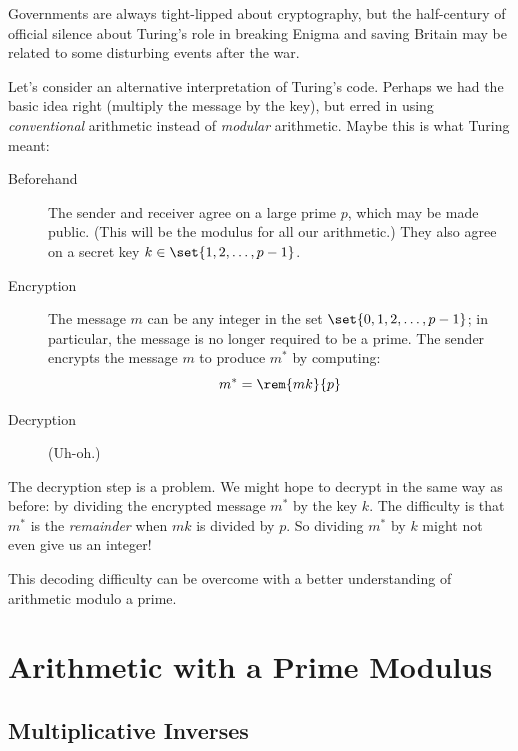 Governments are always tight-lipped about cryptography, but the
half-century of official silence about Turing's role in breaking
Enigma and saving Britain may be related to some disturbing events
after the war.

Let's consider an alternative interpretation of Turing's code.
Perhaps we had the basic idea right (multiply the message by the key),
but erred in using \textit{conventional} arithmetic instead of
\textit{modular} arithmetic.  Maybe this is what Turing meant:
%
\begin{description}

\item[Beforehand] The sender and receiver agree on a large prime $p$,
which may be made public.  (This will be the modulus for all our
arithmetic.)  They also agree on a secret key $k \in \set{1, 2,
\dots, p-1}$.

\item[Encryption] The message $m$ can be any integer in the set
$\set{0, 1, 2, \dots, p-1}$; in particular, the message is no longer
required to be a prime.  The sender encrypts the message $m$ to
produce $m^*$ by computing:
%
\begin{equation}
m^* = \rem{mk}{p} \label{eq:turing-code}
\end{equation}

\item[Decryption] (Uh-oh.)

\end{description}

The decryption step is a problem.  We might hope to decrypt in the
same way as before: by dividing the encrypted message $m^*$ by the key
$k$.  The difficulty is that $m^*$ is the \textit{remainder} when $mk$
is divided by $p$.  So dividing $m^*$ by $k$ might not even give us an
integer!

This decoding difficulty can be overcome with a better understanding
of arithmetic modulo a prime.



\section{Arithmetic with a Prime Modulus}

\subsection{Multiplicative Inverses}
\label{sec:prime}

